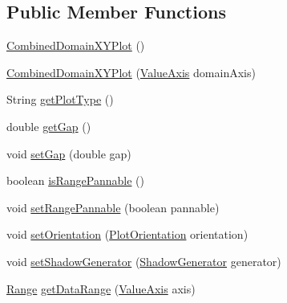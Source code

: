 \subsection*{Public Member Functions}
\begin{DoxyCompactItemize}
\item 
\mbox{\hyperlink{classorg_1_1jfree_1_1chart_1_1plot_1_1_combined_domain_x_y_plot_a27106369c6d1b3c67309830ad6131ea6}{Combined\+Domain\+X\+Y\+Plot}} ()
\item 
\mbox{\hyperlink{classorg_1_1jfree_1_1chart_1_1plot_1_1_combined_domain_x_y_plot_adeab7121d4eadd84d2f8b264abcf8153}{Combined\+Domain\+X\+Y\+Plot}} (\mbox{\hyperlink{classorg_1_1jfree_1_1chart_1_1axis_1_1_value_axis}{Value\+Axis}} domain\+Axis)
\item 
String \mbox{\hyperlink{classorg_1_1jfree_1_1chart_1_1plot_1_1_combined_domain_x_y_plot_abbabc7f009a8cc2f2ba0792ae018d8da}{get\+Plot\+Type}} ()
\item 
double \mbox{\hyperlink{classorg_1_1jfree_1_1chart_1_1plot_1_1_combined_domain_x_y_plot_a382bed0c0682b03a2418721cd26f4243}{get\+Gap}} ()
\item 
void \mbox{\hyperlink{classorg_1_1jfree_1_1chart_1_1plot_1_1_combined_domain_x_y_plot_a17aa2de4bb33adb4d8f379fc11105f93}{set\+Gap}} (double gap)
\item 
boolean \mbox{\hyperlink{classorg_1_1jfree_1_1chart_1_1plot_1_1_combined_domain_x_y_plot_aa2ad5b86eadbd785a28ca13f7fb86d00}{is\+Range\+Pannable}} ()
\item 
void \mbox{\hyperlink{classorg_1_1jfree_1_1chart_1_1plot_1_1_combined_domain_x_y_plot_a56eb179a062b905934822aed6a605e02}{set\+Range\+Pannable}} (boolean pannable)
\item 
void \mbox{\hyperlink{classorg_1_1jfree_1_1chart_1_1plot_1_1_combined_domain_x_y_plot_ac5f8a30878038e688400370dbc831b59}{set\+Orientation}} (\mbox{\hyperlink{classorg_1_1jfree_1_1chart_1_1plot_1_1_plot_orientation}{Plot\+Orientation}} orientation)
\item 
void \mbox{\hyperlink{classorg_1_1jfree_1_1chart_1_1plot_1_1_combined_domain_x_y_plot_ac8c44bc2929c16385430361afa189ae6}{set\+Shadow\+Generator}} (\mbox{\hyperlink{interfaceorg_1_1jfree_1_1chart_1_1util_1_1_shadow_generator}{Shadow\+Generator}} generator)
\item 
\mbox{\hyperlink{classorg_1_1jfree_1_1data_1_1_range}{Range}} \mbox{\hyperlink{classorg_1_1jfree_1_1chart_1_1plot_1_1_combined_domain_x_y_plot_a523053d6ce39485c79245c4a1bc12ed0}{get\+Data\+Range}} (\mbox{\hyperlink{classorg_1_1jfree_1_1chart_1_1axis_1_1_value_axis}{Value\+Axis}} axis)

\end{DoxyCompactItemize}
